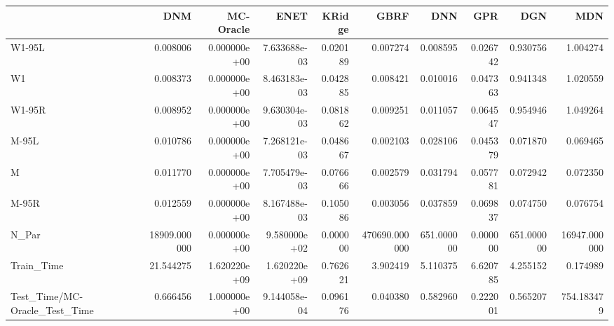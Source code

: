 \begin{tabular}{lrrrrrrrrr}
\toprule
{} &           DNM &     MC-Oracle &          ENET &    KRidge &           GBRF &         DNN &       GPR &         DGN &           MDN \\
\midrule
W1-95L                        &      0.008006 &  0.000000e+00 &  7.633688e-03 &  0.020189 &       0.007274 &    0.008595 &  0.026742 &    0.930756 &      1.004274 \\
W1                            &      0.008373 &  0.000000e+00 &  8.463183e-03 &  0.042885 &       0.008421 &    0.010016 &  0.047363 &    0.941348 &      1.020559 \\
W1-95R                        &      0.008952 &  0.000000e+00 &  9.630304e-03 &  0.081862 &       0.009251 &    0.011057 &  0.064547 &    0.954946 &      1.049264 \\
M-95L                         &      0.010786 &  0.000000e+00 &  7.268121e-03 &  0.048667 &       0.002103 &    0.028106 &  0.045379 &    0.071870 &      0.069465 \\
M                             &      0.011770 &  0.000000e+00 &  7.705479e-03 &  0.076666 &       0.002579 &    0.031794 &  0.057781 &    0.072942 &      0.072350 \\
M-95R                         &      0.012559 &  0.000000e+00 &  8.167488e-03 &  0.105086 &       0.003056 &    0.037859 &  0.069837 &    0.074750 &      0.076754 \\
N\_Par                         &  18909.000000 &  0.000000e+00 &  9.580000e+02 &  0.000000 &  470690.000000 &  651.000000 &  0.000000 &  651.000000 &  16947.000000 \\
Train\_Time                    &     21.544275 &  1.620220e+09 &  1.620220e+09 &  0.762621 &       3.902419 &    5.110375 &  6.620785 &    4.255152 &      0.174989 \\
Test\_Time/MC-Oracle\_Test\_Time &      0.666456 &  1.000000e+00 &  9.144058e-04 &  0.096176 &       0.040380 &    0.582960 &  0.222001 &    0.565207 &    754.183479 \\
\bottomrule
\end{tabular}
